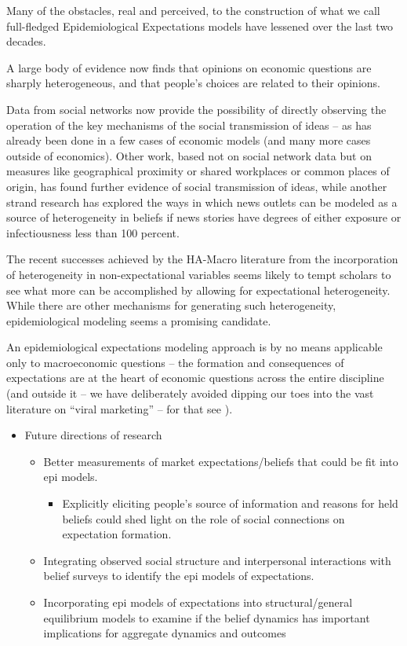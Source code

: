 
\label{conclusion}%


Many of the obstacles, real and perceived, to the construction of what we call
full-fledged Epidemiological Expectations models have lessened over the last two decades.

A large body of evidence now finds that opinions on economic questions are sharply heterogeneous, and that people's choices are related to their opinions.

Data from social networks now provide the possibility of directly observing the operation of the key mechanisms of the social transmission of ideas -- as  has already been done in a few cases of economic models (and many more cases outside of economics).  Other work, based not on social network data but on measures like geographical proximity or shared workplaces or common places of origin, has found further evidence of social transmission of ideas, while another strand research has explored the ways in which news outlets can be modeled as a source of heterogeneity in beliefs if news stories have degrees of either exposure or infectiousness less than 100 percent.

The recent successes achieved by the HA-Macro literature from the incorporation of heterogeneity in non-expectational variables seems likely to tempt scholars to see what more can be accomplished by allowing for expectational heterogeneity.  While there are other mechanisms for generating such heterogeneity, epidemiological modeling seems a promising candidate.

An epidemiological expectations modeling approach is by no means applicable only to macroeconomic questions -- the formation and consequences of expectations are at the heart of economic questions across the entire discipline (and outside it -- we have deliberately avoided dipping our toes into the vast literature on ``viral marketing'' -- for that see \cite{watts2007viral}).


\begin{itemize}
	\item Future directions of research
	\begin{itemize}
		\item Better measurements of market expectations/beliefs that could be fit into epi models.
		\begin{itemize}
			\item Explicitly eliciting people's source of information and reasons for held beliefs could shed light on the role of social connections on expectation formation.
		\end{itemize}
		\item Integrating observed social structure and interpersonal interactions with belief surveys to identify the epi models of expectations.
		\item Incorporating epi models of expectations into structural/general equilibrium models to examine if the belief dynamics has important implications for aggregate dynamics and outcomes
	\end{itemize}
\end{itemize}